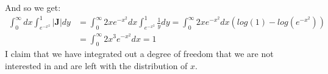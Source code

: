 \documentclass[letterpaper,12pt]{article}
\begin{document}
And so we get:
\begin{equation}
\begin{aligned}
\int_{0}^{\infty}dx\int_{e^{-x^2}}^{1}|\mathbf{J}|dy
&=\int_{0}^{\infty}2 x e^{-x^2} dx\int_{e^{-x^2}}^{1}\frac{1}{y}dy
=\int_{0}^{\infty}2 x e^{-x^2} dx (log(1)-log(e^{-x^2}))\\
&=\int_{0}^{\infty}2 x^3 e^{-x^2} dx=1
\end{aligned}
\end{equation}
I claim that we have integrated out a degree of freedom that we are not interested in and are left with the distribution of $x$.
\end{document}
